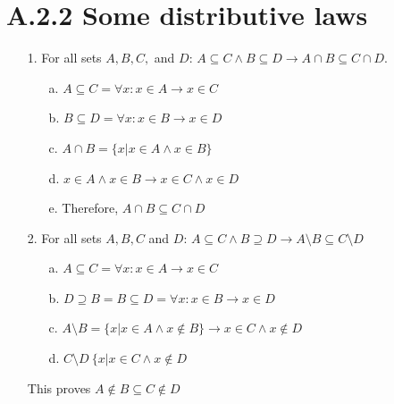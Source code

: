 \documentclass[12pt]{article}
\begin{document}
\section*{A.2.2 Some distributive laws}
\begin{enumerate}
  \item[1.] For all sets ${A, B, C,}$ and ${D}$: ${A \subseteq C \wedge B \subseteq D \rightarrow A \cap B \subseteq C \cap D}$.
    \begin{enumerate}
      \item[a.] ${A \subseteq C = \forall x : x \in A \rightarrow x \in C}$
      \item[b.] ${B \subseteq D = \forall x : x \in B \rightarrow x \in D}$
      \item[c.] ${A \cap B = \{x | x \in A \wedge x \in B\}}$
      \item[d.] ${x \in A \wedge x \in B \rightarrow x \in C \wedge x \in D}$
      \item[e.] Therefore, ${A \cap B \subseteq C \cap D}$
    \end{enumerate}
  \item[2.] For all sets ${A, B, C}$ and ${D}$: ${A \subseteq C \wedge B \supseteq D \rightarrow A \setminus B \subseteq C \setminus D}$
    \begin{enumerate}
      \item[a.] ${A \subseteq C = \forall x : x \in A \rightarrow x \in C}$
      \item[b.] ${D \supseteq B = B \subseteq D = \forall x : x \in B \rightarrow x \in D}$
      \item[c.] ${A \setminus B = \{x | x \in A \wedge x \notin B\} \rightarrow x \in C \wedge x \notin D}$
      \item[d.] ${C \setminus D \ \{x | x \in C \wedge x \notin D}$
    \end{enumerate} 
    
    This proves ${A \notin B \subseteq C \notin D}$      
\end{enumerate}
\end{document}
